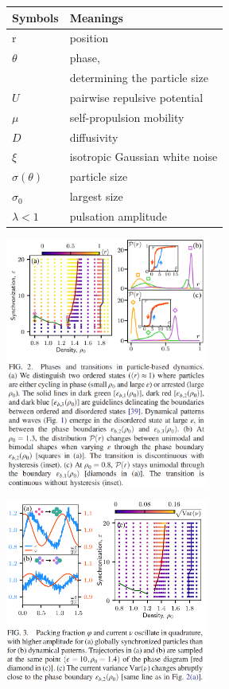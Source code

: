 \documentclass[10pt,aspectratio=43,mathserif,table]{beamer}
\begin{document}
\begin{frame}
\begin{multicols}{2}
{        \begin{tabular}{ll}
            Symbols& Meanings \\
            \hline
            $\mathrm{r}$ & position \\
            $\theta$ & phase, \\
             & determining the particle size \\
            $U$ & pairwise repulsive potential \\
            $\mu$ & self-propulsion mobility \\
            $D$ & diffusivity \\
            $\xi$ & isotropic Gaussian white noise \\
            $\sigma(\theta)$ & particle size \\
            $\sigma_0$ & largest size \\
            $\lambda<1$ & pulsation amplitude \\
        \end{tabular}
        }

    \end{multicols}

\end{frame}

\begin{frame}
    \begin{multicols}{2}
        \includegraphics[width=0.5\textwidth]{figs/p2_f2.png}

        \includegraphics[width=0.5\textwidth]{figs/p2_f3.png}
    \end{multicols}
\end{frame}
\end{document}

